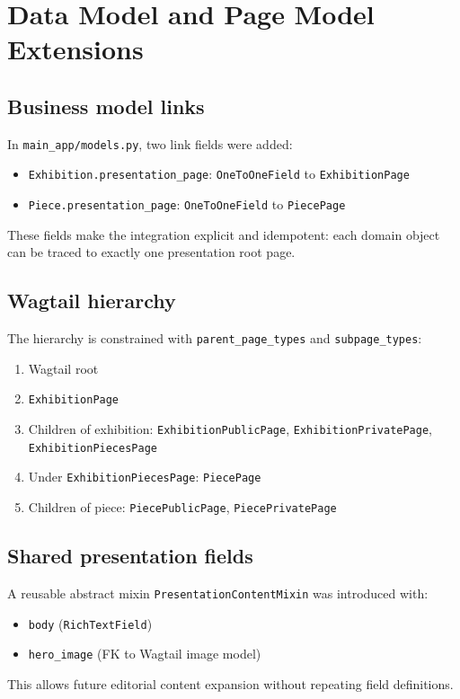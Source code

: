 \documentclass[11pt,a4paper]{article}
\begin{document}
\section{Data Model and Page Model Extensions}
\subsection{Business model links}
In \texttt{main\_app/models.py}, two link fields were added:
\begin{itemize}[leftmargin=*]
    \item \texttt{Exhibition.presentation\_page}: \texttt{OneToOneField} to \texttt{ExhibitionPage}
    \item \texttt{Piece.presentation\_page}: \texttt{OneToOneField} to \texttt{PiecePage}
\end{itemize}
These fields make the integration explicit and idempotent: each domain object can be traced to exactly one presentation root page.

\subsection{Wagtail hierarchy}
The hierarchy is constrained with \texttt{parent\_page\_types} and \texttt{subpage\_types}:
\begin{enumerate}[leftmargin=*]
    \item Wagtail root
    \item \texttt{ExhibitionPage}
    \item Children of exhibition: \texttt{ExhibitionPublicPage}, \texttt{ExhibitionPrivatePage}, \texttt{ExhibitionPiecesPage}
    \item Under \texttt{ExhibitionPiecesPage}: \texttt{PiecePage}
    \item Children of piece: \texttt{PiecePublicPage}, \texttt{PiecePrivatePage}
\end{enumerate}

\subsection{Shared presentation fields}
A reusable abstract mixin \texttt{PresentationContentMixin} was introduced with:
\begin{itemize}[leftmargin=*]
    \item \texttt{body} (\texttt{RichTextField})
    \item \texttt{hero\_image} (FK to Wagtail image model)
\end{itemize}
This allows future editorial content expansion without repeating field definitions.
\end{document}
